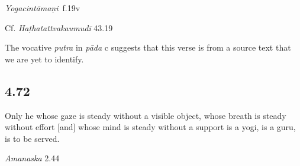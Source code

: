 \begin{ekdosis}

\begin{testimonia}[hp04_071]
\emph{Yogacintāmaṇi}~f.19v
\begin{versinnote}
\end{versinnote}

Cf. \emph{Haṭhatattvakaumudī} 43.19
\begin{versinnote}
\end{versinnote}
\end{testimonia}

The vocative \emph{putra} in \emph{pāda} c suggests that this verse is from a source text that we are yet to identify.

\subsection*{4.72}
\begin{translation}[hp04_072]
Only he whose gaze is steady without a visible object, whose breath is steady without effort [and] whose mind is steady without a support is a yogi, is a guru, is to be served.
\end{translation}


\begin{sources}[hp04_072]
\emph{Amanaska} 2.44
\begin{versinnote}
\end{versinnote}
\end{sources}


\end{ekdosis}

